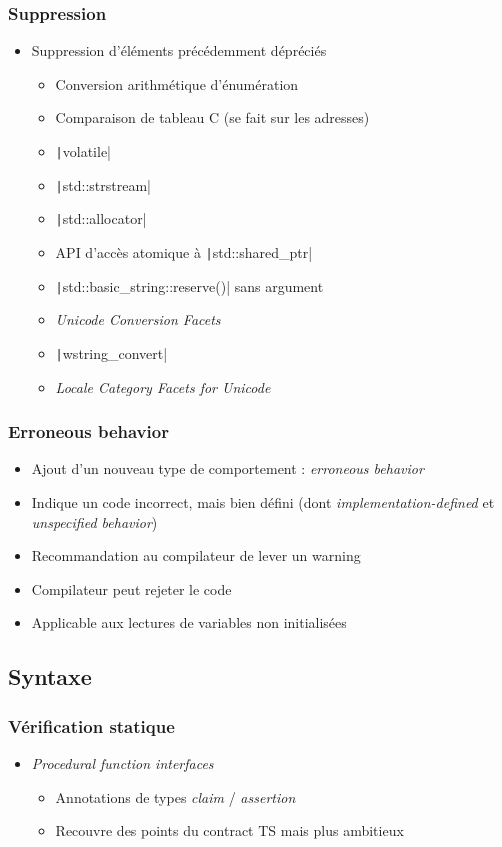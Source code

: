 \documentclass[C++.tex]{subfiles}
\begin{document}
\begin{frame}[fragile]
	\frametitle{Suppression}
	\begin{itemize}
		\item Suppression d'éléments précédemment dépréciés
		\begin{itemize}
			\item Conversion arithmétique d'énumération
			\item Comparaison de tableau C (se fait sur les adresses)
			\item \texttt|volatile|
			\item \texttt|std::strstream|
			\item \texttt|std::allocator|
			\item API d'accès atomique à \texttt|std::shared_ptr|
			\item \texttt|std::basic_string::reserve()| sans argument
			\item \textit{Unicode Conversion Facets}
			\item \texttt|wstring_convert|
			\item \textit{Locale Category Facets for Unicode}
		\end{itemize}
	\end{itemize}
\end{frame}

\begin{frame}[fragile]
	\frametitle{Erroneous behavior}
	\begin{itemize}
		\item Ajout d'un nouveau type de comportement : \textit{erroneous behavior}
		\item Indique un code incorrect, mais bien défini (dont \textit{implementation-defined} et \textit{unspecified behavior})
		\item Recommandation au compilateur de lever un warning
		\item Compilateur peut rejeter le code
		\item Applicable aux lectures de variables non initialisées
	\end{itemize}
\end{frame}

\subsection*{Syntaxe}
\begin{frame}[fragile]
	\frametitle{Vérification statique}
	\begin{itemize}
		\item \textit{Procedural function interfaces} 
		\begin{itemize}
			\item Annotations de types \textit{claim} / \textit{assertion}
			\item Recouvre des points du contract TS mais plus ambitieux
		\end{itemize}
	\end{itemize}
\end{frame}
\end{document}
